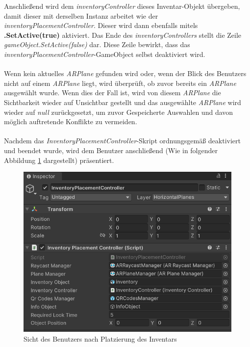 Anschließend wird dem \textit{inventoryController} dieses Inventar-Objekt übergeben, damit dieser mit derselben Instanz
arbeitet wie der \textit{inventoryPlacementController}. Dieser wird dann ebenfalls mitels \textbf{.SetActive(true)} aktiviert.
Das Ende des \textit{inventoryControllers} stellt die Zeile \textit{gameObject.SetActive(false)} dar. Diese Zeile bewirkt,
dass das \textit{inventoryPlacementController}-GameObject selbst deaktiviert wird.\\
\\
Wenn kein aktuelles \textit{ARPlane} gefunden wird oder, wenn der Blick des Benutzers nicht auf einem \textit{ARPlane}
liegt, wird überprüft, ob zuvor bereits ein \textit{ARPlane} ausgewählt wurde. Wenn dies der Fall ist, wird von diesem
\textit{ARPlane} die Sichtbarkeit wieder auf Unsichtbar gestellt und das ausgewählte \textit{ARPlane} wird wieder auf
\textit{null} zurückgesetzt, um zuvor Gespeicherte Auswahlen und davon möglich auftretende Konflikte zu vermeiden.\\
\\
Nachdem das \textit{InventoryPlacementController}-Skript ordnungsgemäß deaktiviert und beendet wurde, wird dem Benutzer
anschließend (Wie in folgender Abbildung \ref{fig:inventoryPlaced} dargestellt) präsentiert.
\begin{figure}[h]
\centering
\includegraphics[scale=0.8]{images/invPlace_Editor}
\caption{Sicht des Benutzers nach Platzierung des Inventars}
\label{fig:inventoryPlaced}
\end{figure}

